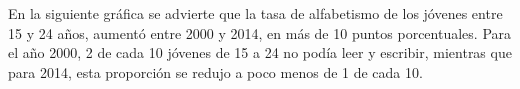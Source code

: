 En la siguiente gráfica se advierte que la tasa de alfabetismo de los jóvenes entre 15 y 24 años, aumentó entre 2000 y 2014, en más de 10 puntos porcentuales. Para el año 2000, 2 de cada 10 jóvenes de 15 a 24 no podía leer y escribir, mientras que para 2014, esta proporción se redujo a poco menos de 1 de cada 10.